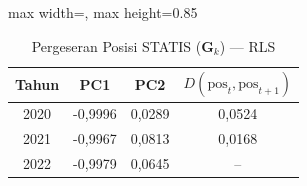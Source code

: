 \begin{table}[H]
\centering
\caption{Pergeseran Posisi STATIS ($\mathbf{G}_k$) --- RLS} \label{tab:sample1jarak_statis_loading_rls}
\begin{adjustbox}{max width=\textwidth, max height=0.85\textheight}
\begin{tabular}{|c|c|c|c|}
\hline
\textbf{Tahun} & \textbf{PC1} & \textbf{PC2} & \textbf{$D(\text{pos}_t, \text{pos}_{t+1})$} \\
\hline
2020 & -0,9996 & 0,0289 & 0,0524 \\
2021 & -0,9967 & 0,0813 & 0,0168 \\
2022 & -0,9979 & 0,0645 & -- \\
\hline
\end{tabular}
\end{adjustbox}
\end{table}
